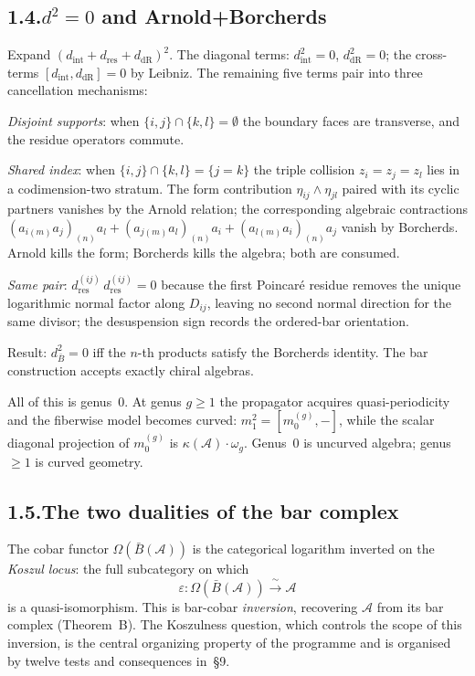 \documentclass[11pt]{report}
\theoremstyle{definition}
\theoremstyle{remark}
\providecommand{\cA}{\mathcal{A}}
\providecommand{\barB}{\bar{B}}
\numberwithin{equation}{section}
\begin{document}
\subsection*{1.4.\enspace $d^2=0$ and Arnold+Borcherds}

Expand $(d_{\mathrm{int}}+d_{\mathrm{res}}+d_{\mathrm{dR}})^2$. The
diagonal terms: $d_{\mathrm{int}}^2=0$, $d_{\mathrm{dR}}^2=0$; the
cross-terms $[d_{\mathrm{int}},d_{\mathrm{dR}}]=0$ by Leibniz. The
remaining five terms pair into three cancellation mechanisms:

\emph{Disjoint supports}: when $\{i,j\}\cap\{k,l\}=\emptyset$ the
boundary faces are transverse, and the residue operators commute.

\emph{Shared index}: when $\{i,j\}\cap\{k,l\}=\{j=k\}$ the triple
collision $z_i=z_j=z_l$ lies in a codimension-two stratum. The
form contribution $\eta_{ij}\wedge\eta_{jl}$ paired with its cyclic
partners vanishes by the Arnold relation; the corresponding
algebraic contractions
$(a_{i(m)}a_j)_{(n)}a_l+(a_{j(m)}a_l)_{(n)}a_i+(a_{l(m)}a_i)_{(n)}a_j$
vanish by Borcherds. Arnold kills the form; Borcherds kills the
algebra; both are consumed.

\emph{Same pair}: $d_{\mathrm{res}}^{(ij)}\,d_{\mathrm{res}}^{(ij)}=0$
because the first Poincar\'e residue removes the unique logarithmic
normal factor along \(D_{ij}\), leaving no second normal direction for
the same divisor; the desuspension sign records the ordered-bar
orientation.

Result: $d_{\barB}^2=0$ iff the $n$-th products satisfy the Borcherds
identity. The bar construction accepts exactly chiral algebras.

All of this is genus~$0$. At genus $g\ge 1$ the propagator acquires
quasi-periodicity and the fiberwise model becomes curved:
$m_1^2=[m_0^{(g)},-]$, while the scalar diagonal projection of
$m_0^{(g)}$ is $\kappa(\cA)\cdot\omega_g$. Genus~$0$ is uncurved algebra;
genus~$\ge 1$ is curved geometry.

\subsection*{1.5.\enspace The two dualities of the bar complex}

The cobar functor $\Omega(\barB(\cA))$ is the categorical logarithm
inverted on the \emph{Koszul locus}: the full subcategory on which
\[
\varepsilon\colon\Omega(\barB(\cA))\xrightarrow{\;\sim\;}\cA
\]
is a quasi-isomorphism. This is bar-cobar \emph{inversion}, recovering
$\cA$ from its bar complex (Theorem~B). The Koszulness question, which
controls the scope of this inversion, is the central organizing
property of the programme and is organised by twelve tests and
consequences in~\S9.
\end{document}
